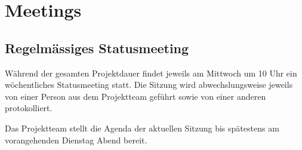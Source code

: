 \section{Meetings}
\subsection{Regelmässiges Statusmeeting}
Während der gesamten Projektdauer findet jeweils am Mittwoch um 10 Uhr ein wöchentliches Statusmeeting statt. Die Sitzung wird abwechslungsweise jeweils von einer Person aus dem Projektteam geführt sowie von einer anderen protokolliert.

Das Projektteam stellt die Agenda der aktuellen Sitzung bis spätestens am vorangehenden Dienstag Abend bereit.